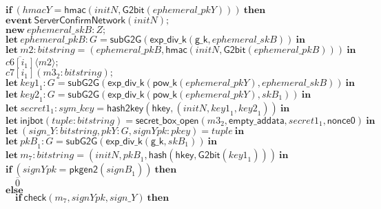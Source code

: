 \documentclass{article}
\newcommand{\cinput}[2]{{#1}({#2})}
\newcommand{\coutput}[2]{\overline{#1}\langle{#2}\rangle}
\newcommand{\kw}[1]{\mathbf{#1}}
\newcommand{\kwf}[1]{\mathsf{#1}}
\newcommand{\var}[1]{\mathit{#1}}
\newcommand{\kwt}[1]{\mathit{#1}}
\newcommand{\kwc}[1]{\mathit{#1}}
\begin{document}
\begin{tabbing}
\>$\quad \kw{if}\ (\var{hmacY}  =  \kwf{hmac}(\var{initN}, \kwf{G2bit}(\var{ephemeral{\_}pkY})))\ \kw{then}$\\
\>$\quad \kw{event}\ \kwf{ServerConfirmNetwork}(\var{initN});$\\
\>$\quad \kw{new}\ \var{ephemeral{\_}skB}: \kwt{Z};$\\
\>$\quad \kw{let}\ \var{ephemeral{\_}pkB}: \kwt{G} = \kwf{subG2G}(\kwf{exp{\_}div{\_}k}(\kwf{g{\_}k}, \var{ephemeral{\_}skB}))\ \kw{in}$\\
\>$\quad \kw{let}\ \var{m2}: \kwt{bitstring} = \kwf{}(\var{ephemeral{\_}pkB}, \kwf{hmac}(\var{initN}, \kwf{G2bit}(\var{ephemeral{\_}pkB})))\ \kw{in}$\\
\>$\quad \coutput{\kwc{c6}[\var{i}_{1}]}{\var{m2}};$\\
\>$\quad \cinput{\kwc{c7}[\var{i}_{1}]}{\var{m3}_{2}: \kwt{bitstring}};$\\
\>$\quad \kw{let}\ \var{key1}_{1}: \kwt{G} = \kwf{subG2G}(\kwf{exp{\_}div{\_}k}(\kwf{pow{\_}k}(\var{ephemeral{\_}pkY}), \var{ephemeral{\_}skB}))\ \kw{in}$\\
\>$\quad \kw{let}\ \var{key2}_{1}: \kwt{G} = \kwf{subG2G}(\kwf{exp{\_}div{\_}k}(\kwf{pow{\_}k}(\var{ephemeral{\_}pkY}), \var{skB}_{1}))\ \kw{in}$\\
\>$\quad \kw{let}\ \var{secret1}_{1}: \kwt{sym{\_}key} = \kwf{hash2key}(\kwf{hkey}, \kwf{}(\var{initN}, \var{key1}_{1}, \var{key2}_{1}))\ \kw{in}$\\
\>$\quad \kw{let}\ \kwf{injbot}(\var{tuple}: \kwt{bitstring}) = \kwf{secret{\_}box{\_}open}(\var{m3}_{2}, \kwf{empty{\_}addata}, \var{secret1}_{1}, \kwf{nonce0})\ \kw{in}$\\
\>$\quad \kw{let}\ \kwf{}(\var{sign{\_}Y}: \kwt{bitstring}, \var{pkY}: \kwt{G}, \var{signYpk}: \kwt{pkey}) = \var{tuple}\ \kw{in}$\\
\>$\quad \kw{let}\ \var{pkB}_{1}: \kwt{G} = \kwf{subG2G}(\kwf{exp{\_}div{\_}k}(\kwf{g{\_}k}, \var{skB}_{1}))\ \kw{in}$\\
\>$\quad \kw{let}\ \var{m}_{7}: \kwt{bitstring} = \kwf{}(\var{initN}, \var{pkB}_{1}, \kwf{hash}(\kwf{hkey}, \kwf{G2bit}(\var{key1}_{1})))\ \kw{in}$\\
\>$\quad \kw{if}\ (\var{signYpk}  =  \kwf{pkgen2}(\var{signB}_{1}))\ \kw{then}$\\
\>$\quad \quad \overline{0}$\\
\>$\quad \kw{else}$\\
\>$\quad \quad \kw{if}\ \kwf{check}(\var{m}_{7}, \var{signYpk}, \var{sign{\_}Y})\ \kw{then}$\\

\end{tabbing}
\end{document}
